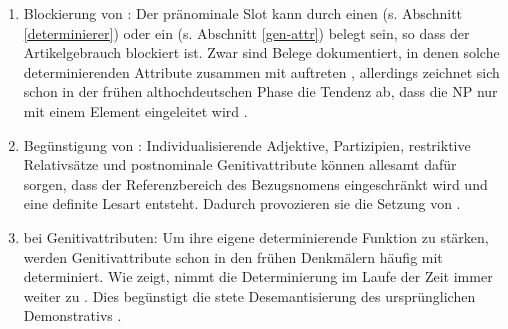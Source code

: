 \begin{enumerate}
\item Blockierung von : Der pränominale Slot kann durch einen  (s. Abschnitt \ref{determinierer}) oder ein  (s. Abschnitt \ref{gen-attr}) belegt sein, so dass der Artikelgebrauch blockiert ist. Zwar sind Belege dokumentiert, in denen solche determinierenden Attribute zusammen  mit  auftreten \parencite[vgl. z.B. die Belegsammlungen in][60--78]{Graf1905},  allerdings zeichnet sich schon in der frühen althochdeutschen Phase die Tendenz ab, dass die NP  nur mit einem Element eingeleitet wird \parencite{Oubouzar1997}.
\item Begünstigung von : Individualisierende  Adjektive, Partizipien, restriktive Relativsätze und postnominale Genitivattribute  können allesamt dafür sorgen, dass der Referenzbereich  des Bezugsnomens eingeschränkt wird und eine definite Lesart entsteht. Dadurch provozieren sie die Setzung von  \parencite[24--25]{Schrodt2004}.
\item {} bei Genitivattributen: Um ihre eigene determinierende Funktion zu stärken, werden Genitivattribute  schon in den frühen Denkmälern häufig mit  determiniert. Wie \textcite{Oubouzar1989, Oubouzar1992, Oubouzar1997} zeigt, nimmt die Determinierung im Laufe der Zeit immer weiter zu \parencite[185]{Leiss2000}. Dies begünstigt die stete Desemantisierung des ursprünglichen Demonstrativs \parencite{Szczepaniak2015}.
\end{enumerate}



